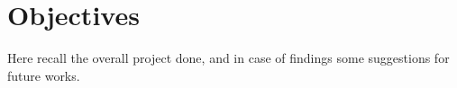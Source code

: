 \section{Objectives}

Here recall the overall project done, and in case of findings some suggestions for future works.\\
